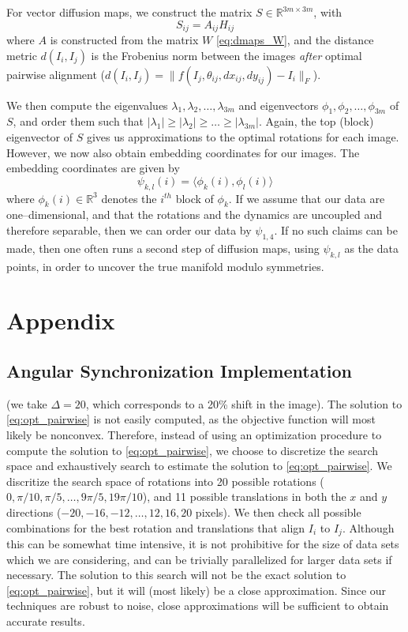 \documentclass[11pt]{article}
\begin{document}
For vector diffusion maps, we construct the matrix $S \in \mathbb{R}^{3m \times 3m}$, with
\begin{equation}
	S_{ij} = A_{ij} H_{ij}
\end{equation}
%
where $A$ is constructed from the matrix $W$ \eqref{eq:dmaps_W}, and the distance metric $d(I_i, I_j)$ is the Frobenius norm between the images {\em after} optimal pairwise alignment ($d(I_i, I_j) = \| f(I_j, \theta_{ij}, dx_{ij}, dy_{ij}) - I_i \|_F$).

We then compute the eigenvalues $\lambda_1, \lambda_2, \dots, \lambda_{3m}$ and eigenvectors $\phi_1, \phi_2, \dots, \phi_{3m}$ of $S$, and order them such that $|\lambda_1| \ge |\lambda_2| \ge \dots \ge |\lambda_{3m}|$.
%
Again, the top (block) eigenvector of $S$ gives us approximations to the optimal rotations for each image.
%
However, we now also obtain embedding coordinates for our images.
%
The embedding coordinates are given by 
\begin{equation}
\psi_{k,l} (i) = \langle \phi_k(i), \phi_l(i) \rangle
\end{equation}
where $\phi_k(i) \in \mathbb{R}^3$ denotes the $i^{th}$ block of $\phi_k$.
%
If we assume that our data are one--dimensional, and that the rotations and the dynamics are uncoupled and therefore separable, then we can order our data by $\psi_{1,4}$.
%
If no such claims can be made, then one often runs a second step of diffusion maps, using $\psi_{k,l}$ as the data points, in order to uncover the true manifold modulo symmetries. 


\section{Appendix}

\subsection{Angular Synchronization Implementation}
(we take $\Delta=20$, which corresponds to a 20\% shift in the image). 
%
The solution to \eqref{eq:opt_pairwise} is not easily computed, as the objective function will most likely be nonconvex.
%
Therefore, instead of using an optimization procedure to compute the solution to \eqref{eq:opt_pairwise}, we choose to discretize the search space and exhaustively search to estimate the solution to \eqref{eq:opt_pairwise}.
%
We discritize the search space of rotations into 20 possible rotations ($0, \pi/10, \pi/5, \dots, 9 \pi/5, 19\pi/10$), and 11 possible translations in both the $x$ and $y$ directions ($-20, -16, -12, \dots, 12, 16, 20$ pixels). 
%
We then check all possible combinations for the best rotation and translations that align $I_i$ to $I_j$. 
%
Although this can be somewhat time intensive, it is not prohibitive for the size of data sets which we are considering, and can be trivially parallelized for larger data sets if necessary.
%
The solution to this search will not be the exact solution to \eqref{eq:opt_pairwise}, but it will (most likely) be a close approximation.
%
Since our techniques are robust to noise, close approximations will be sufficient to obtain accurate results.
\end{document}
